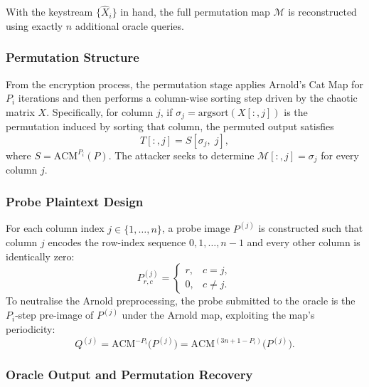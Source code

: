 With the keystream $\{\hat{X}_i\}$ in hand, the full permutation map $\mathcal{M}$ is reconstructed using exactly $n$ additional oracle queries.

\subsubsection{Permutation Structure}

From the encryption process, the permutation stage applies Arnold's Cat Map for $P_i$ iterations and then performs a column-wise sorting step driven by the chaotic matrix $X$. Specifically, for column $j$, if $\sigma_j = \mathrm{argsort}(X[:,j])$ is the permutation induced by sorting that column, the permuted output satisfies
\begin{equation}
    T[:,j] = S[\sigma_j,\; j],
\end{equation}
where $S = \mathrm{ACM}^{P_i}(P)$. The attacker seeks to determine $\mathcal{M}[:,j] = \sigma_j$ for every column $j$.

\subsubsection{Probe Plaintext Design}

For each column index $j \in \{1, \ldots, n\}$, a probe image $P^{(j)}$ is constructed such that column $j$ encodes the row-index sequence $0, 1, \ldots, n-1$ and every other column is identically zero:
\begin{equation}
P^{(j)}_{r,c} =
\begin{cases}
r, & c = j,\\
0, & c \neq j.
\end{cases}
\end{equation}
To neutralise the Arnold preprocessing, the probe submitted to the oracle is the $P_i$-step pre-image of $P^{(j)}$ under the Arnold map, exploiting the map's periodicity:
\begin{equation}
    Q^{(j)} = \mathrm{ACM}^{-P_i}\!\bigl(P^{(j)}\bigr) = \mathrm{ACM}^{(3n+1-P_i)}\!\bigl(P^{(j)}\bigr).
\end{equation}

\subsubsection{Oracle Output and Permutation Recovery}

